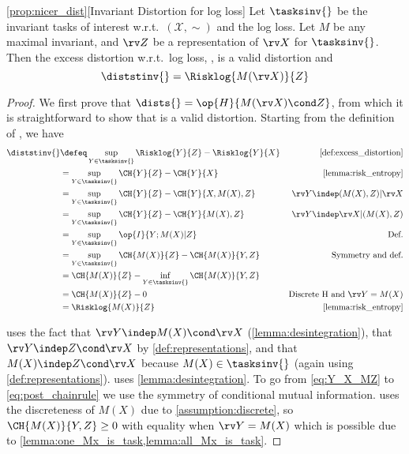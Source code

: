 \documentclass[final]{article}
\begin{document}
\begin{manualprop}{\ref{prop:nicer_dist}}[Invariant Distortion for log loss]\label{appx:prop:invariant_distortion}
Let $\tasksinv{}$ be the invariant tasks of interest w.r.t.\  $(\mathcal{X},\sim)$ and the log loss. Let $M$ be any maximal invariant, and $\rv Z$ be a representation of $\rv X$ for $\tasksinv{}$.
Then the excess distortion w.r.t.\ log loss, \disttextinv{}, is a valid distortion and
\begin{equation}
\diststinv{} = \Risklog{M(\rv X)}{Z}
\end{equation}
\end{manualprop}
\begin{proof}
We first prove that $\dists{} = \op{H}{M(\rv X) \cond Z}$, from which it is straightforward to show that \disttextinv{} is a valid distortion. Starting from the definition of \disttextinv{}, we have
\begin{align}
\diststinv{} &\defeq \sup_{Y \in \tasksinv{} } \Risklog{Y}{Z} - \Risklog{Y}{X} & \text{\cref{def:excess_distortion}} \\
&= \sup_{Y \in \tasksinv{} } \CH{Y}{Z} - \CH{Y}{X} & \text{\cref{lemma:risk_entropy}} \\
&= \sup_{Y \in \tasksinv{} } \CH{Y}{Z} - \CH{Y}{X,M(X),Z} & \rv Y \indep (M(X),Z) | \rv X \label{eq:Y_MZ_X}  \\
&= \sup_{Y \in \tasksinv{} } \CH{Y}{Z} - \CH{Y}{M(X),Z} & \rv Y \indep \rv X | (M(X),Z)  \label{eq:Y_X_MZ} \\
 &= \sup_{Y \in \tasksinv{}} \op{I}{Y ; M(X)|Z} \label{eq:IYMZ} & \text{Def.} \\
&= \sup_{Y \in \tasksinv{}} \CH{M(X)}{Z} - \CH{M(X)}{Y,Z} \label{eq:post_chainrule} & \text{Symmetry and def.} \\
&= \CH{M(X)}{Z} - \inf_{Y \in \tasksinv{}}  \CH{M(X)}{Y,Z}  \\
&= \CH{M(X)}{Z} - 0 \label{appx:eq:posent} & \text{Discrete H and $\rv Y = M(X)$} \\
&= \Risklog{M(X)}{Z}   & \text{\cref{lemma:risk_entropy}}
 \end{align}

 uses the fact that $\rv Y \indep M(X) \cond  \rv X$ (\cref{lemma:desintegration}), that $\rv Y \indep Z \cond  \rv X$ by \cref{def:representations}, and that  $M(X) \indep Z \cond  \rv X$ because $M(X) \in \tasksinv{}$ (again using \cref{def:representations}).
 uses \cref{lemma:desintegration}.
To go from \cref{eq:Y_X_MZ} to \cref{eq:post_chainrule} we use the symmetry of conditional mutual information.
 uses the discreteness of $M(X)$ due to \cref{assumption:discrete}, so $\CH{M(X)}{Y,Z} \geq 0$ with equality when $\rv Y = M(X)$ which is possible due to \cref{lemma:one_Mx_is_task,lemma:all_Mx_is_task}.


\end{proof}
\end{document}
